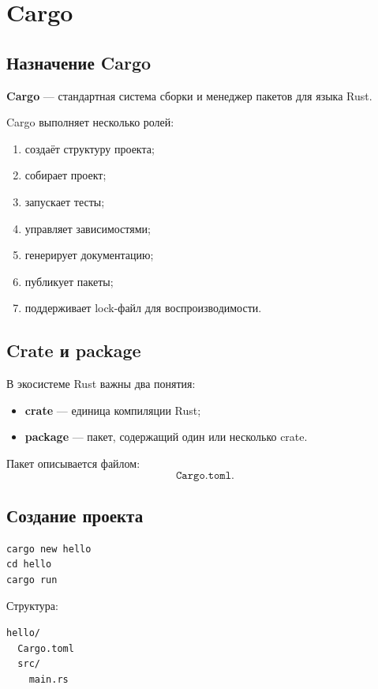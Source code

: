 \documentclass[12pt,a4paper]{article}
\begin{document}
\section{Cargo}

\subsection{Назначение Cargo}

\textbf{Cargo} --- стандартная система сборки и менеджер пакетов для языка Rust.

Cargo выполняет несколько ролей:
\begin{enumerate}
    \item создаёт структуру проекта;
    \item собирает проект;
    \item запускает тесты;
    \item управляет зависимостями;
    \item генерирует документацию;
    \item публикует пакеты;
    \item поддерживает lock-файл для воспроизводимости.
\end{enumerate}

\subsection{Crate и package}

В экосистеме Rust важны два понятия:
\begin{itemize}
    \item \textbf{crate} --- единица компиляции Rust;
    \item \textbf{package} --- пакет, содержащий один или несколько crate.
\end{itemize}

Пакет описывается файлом:
\[
\texttt{Cargo.toml}.
\]

\subsection{Создание проекта}

\begin{lstlisting}
cargo new hello
cd hello
cargo run
\end{lstlisting}

Структура:

\begin{lstlisting}
hello/
  Cargo.toml
  src/
    main.rs
\end{lstlisting}
\end{document}
